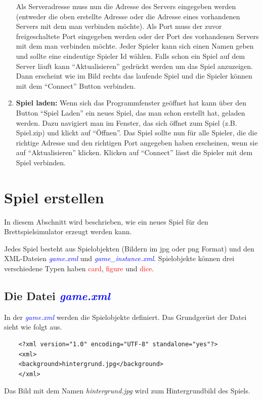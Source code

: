 \documentclass[ngerman]{scrbook}
\newcommand{\gamefile}[1]{\textit{\textcolor{blue}{#1}}\xspace}
\newcommand{\game}{\gamefile{game.xml}}
\newcommand{\gameinstance}{\gamefile{game\_instance.xml}}
\newcommand{\card}{\textcolor{red}{card}\xspace}
\newcommand{\gamefigure}{\textcolor{red}{figure}\xspace}
\newcommand{\dice}{\textcolor{red}{dice}\xspace}
\begin{document}
\begin{enumerate}[label=\arabic*)]
		Als Serveradresse muss nun die Adresse des Servers eingegeben werden (entweder die oben erstellte Adresse oder die Adresse eines vorhandenen Servers mit dem man verbinden möchte). Als Port muss der zuvor freigeschaltete Port eingegeben werden oder der Port des vorhandenen Servers mit dem man verbinden möchte. Jeder Spieler kann sich einen Namen geben und sollte eine eindeutige Spieler Id wählen. Falls schon ein Spiel auf dem Server läuft kann ``Aktualisieren'' gedrückt werden um das Spiel anzuzeigen. Dann erscheint wie im Bild rechts das laufende Spiel und die Spieler können mit dem ``Connect'' Button verbinden.
		
		\item \textbf{Spiel laden:} Wenn sich das Programmfenster geöffnet hat kann über den Button ``Spiel Laden'' ein neues Spiel, das man schon erstellt hat, geladen werden. Dazu navigiert man im Fenster, das sich öffnet zum Spiel (z.B. Spiel.zip) und klickt auf ``Öffnen''. Das Spiel sollte nun für alle Spieler, die die richtige Adresse und den richtigen Port angegeben haben erscheinen, wenn sie auf ``Aktualisieren'' klicken. Klicken auf ``Connect'' lässt die Spieler mit dem Spiel verbinden.
	\end{enumerate}
	
	
	\chapter{Spiel erstellen}\label{chap:createGames}
	In diesem Abschnitt wird beschrieben, wie ein neues Spiel für den Brettspielsimulator erzeugt werden kann. 
	
	Jedes Spiel besteht aus Spielobjekten (Bildern im jpg oder png Format) und den XML-Dateien \game und \gameinstance. Spielobjekte können drei verschiedene Typen haben \card, \gamefigure und \dice.
	\section{Die Datei \game}
	In der \game werden die Spielobjekte definiert. Das Grundgerüst der Datei sieht wie folgt aus. 
	
	\lstset{language=XML}
	\begin{lstlisting}
	<?xml version="1.0" encoding="UTF-8" standalone="yes"?>
	<xml>
	<background>hintergrund.jpg</background>
	</xml>
	\end{lstlisting}
	
	Das Bild mit dem Namen \textit{hintergrund.jpg} wird zum Hintergrundbild des Spiels.
\end{document}
